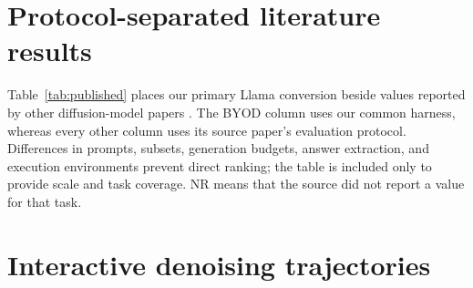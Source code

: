 \documentclass{article}
\begin{document}
\section{Protocol-separated literature results}
\label{app:published-results}

Table~\ref{tab:published} places our primary Llama conversion beside values reported by other diffusion-model papers \citep{nie2025llada,ye2025dream,nie2026illada,fu2025efficientdlm}. The BYOD column uses our common harness, whereas every other column uses its source paper's evaluation protocol. Differences in prompts, subsets, generation budgets, answer extraction, and execution environments prevent direct ranking; the table is included only to provide scale and task coverage. NR means that the source did not report a value for that task.

\begin{table}[!htbp]
\caption{Our Llama result and protocol-separated published diffusion-model accuracies. Bold marks the largest reported value in each row; it does not imply a controlled comparison. No cross-task averages are shown because task coverage differs by model.}
\label{tab:published}
\centering
\scriptsize
{}
\end{table}

\section{Interactive denoising trajectories}
\label{app:demo-trajectories}
\end{document}
